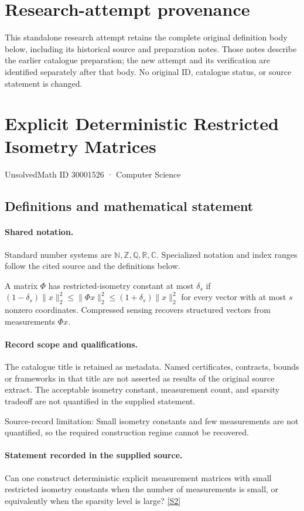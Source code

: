 \documentclass[11pt]{article}
\begin{document}
\section*{Research-attempt provenance}
This standalone research attempt retains the complete original definition body below,
including its historical source and preparation notes. Those notes describe the
earlier catalogue preparation; the new attempt and its verification are identified
separately after that body. No original ID, catalogue status, or source statement is changed.

\section{Explicit Deterministic Restricted Isometry Matrices}\label{30001526}
{\small UnsolvedMath ID 30001526 · Computer Science}
\subsection{Definitions and mathematical statement}

\paragraph{Shared notation.}Standard number systems are $\mathbb N,\mathbb Z,\mathbb Q,\mathbb R,\mathbb C$. Specialized notation and index ranges follow the cited source and the definitions below.


A matrix $\Phi$ has restricted-isometry constant at most $\delta_s$ if $(1-\delta_s)\lVert x\rVert_2^2\leq\lVert\Phi x\rVert_2^2\leq(1+\delta_s)\lVert x\rVert_2^2$ for every vector with at most $s$ nonzero coordinates. Compressed sensing recovers structured vectors from measurements $\Phi x$.
\paragraph{Record scope and qualifications.}
The catalogue title is retained as metadata. Named certificates, contracts, bounds or frameworks in that title are not asserted as results of the original source extract.
The acceptable isometry constant, measurement count, and sparsity tradeoff are not quantified in the supplied statement.

Source-record limitation: Small isometry constants and few measurements are not quantified, so the required construction regime cannot be recovered.
\paragraph{Statement recorded in the supplied source.}
Can one construct deterministic explicit measurement matrices with small restricted isometry constants when the number of measurements is small, or equivalently when the sparsity level is large? \href{https://doi.org/10.4171/owr/2010/33}{[S2]}
\end{document}
